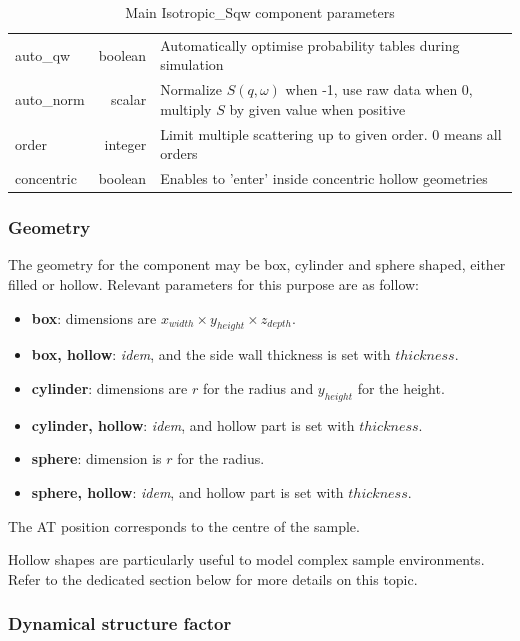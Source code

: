 \begin{table}
\begin{center}
{\begin{tabular}{|lr|p{}|}
    \hline
auto\_qw  & boolean & Automatically optimise probability tables during simulation  \\
auto\_norm& scalar  & Normalize $S(q,\omega)$ when -1, use raw data when 0, multiply $S$ by given value when positive \\
order     & integer & Limit multiple scattering up to given order. 0 means all orders  \\
concentric& boolean & Enables to 'enter' inside concentric hollow geometries  \\
    \hline
    \end{tabular}
    \caption{Main Isotropic\_Sqw component parameters}
    \label{t:sqw-param}
  }
  \end{center}
\end{table}

\subsubsection{Geometry}

The geometry for the component may be box, cylinder and sphere shaped, either filled or hollow. Relevant parameters for this purpose are as follow:
\begin{itemize}
\item \textbf{box}: dimensions are $x_{width} \times y_{height} \times z_{depth}$.
\item \textbf{box, hollow}: \emph{idem}, and the side wall thickness is set with $thickness$.
\item \textbf{cylinder}: dimensions are $r$ for the radius and $y_{height}$ for the height.
\item \textbf{cylinder, hollow}: \emph{idem}, and hollow part is set with $thickness$.
\item \textbf{sphere}: dimension is $r$ for the radius.
\item \textbf{sphere, hollow}: \emph{idem}, and hollow part is set with $thickness$.
\end{itemize}
The AT position corresponds to the centre of the sample.

Hollow shapes are particularly useful to model complex sample environments. Refer to the dedicated section below for more details on this topic.

\subsubsection{Dynamical structure factor}

